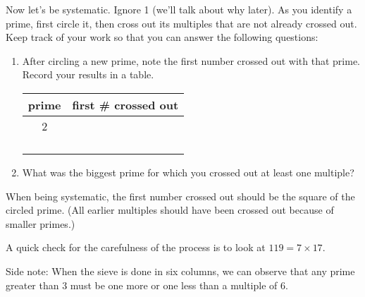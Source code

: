 \documentclass[nooutcomes]{ximera}
\begin{document}
\begin{problem}
Now let's be systematic.  Ignore 1 (we'll talk about why later).   
As you identify a prime, first circle it, then cross out its multiples that are not already crossed out.  
Keep track of your work so that you can answer the following questions:  
\begin{enumerate}
\item After circling a new prime, note the first number crossed out with that prime.  Record your results in a table.


{\renewcommand{\arraystretch}{1.4}
\begin{tabular}{c|c}
        prime    & first \# crossed out \\
\hline
         2       &                      \\
                 &                      \\
                 &                      \\
                 &                      \\
                 &                      \\
\end{tabular}
}

\item What was the biggest prime for which you crossed out at least one multiple?
\end{enumerate}

\begin{teachingnote}
When being systematic, the first number crossed out should be the square of the circled prime.  (All earlier multiples should have been crossed out because of smaller primes.)  

A quick check for the carefulness of the process is to look at $119 = 7 \times 17$. 

Side note:  When the sieve is done in six columns, we can observe that any prime greater than 3 must be one more or one less than a multiple of 6.
\end{teachingnote}


\end{problem}
\end{document}
